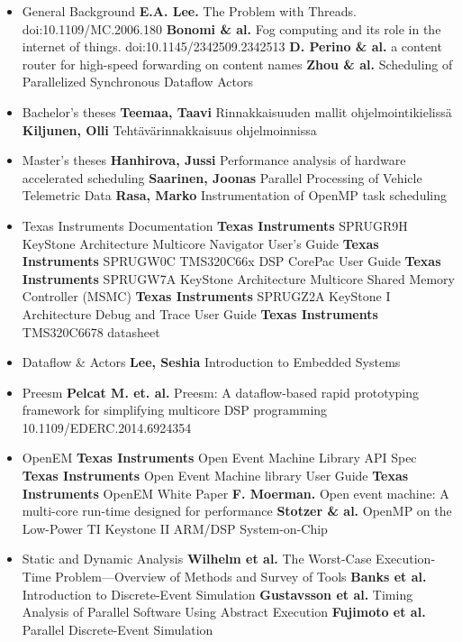 \begin{itemize}[leftmargin=-.5in]
\item[] General Background
    \subitem \textbf{E.A. Lee.} The Problem with Threads. doi:10.1109/MC.2006.180
    \subitem \textbf{Bonomi \& al.} Fog computing and its role in the internet of things. doi:10.1145/2342509.2342513
    \subitem \textbf{D. Perino \& al.} a content router for high-speed forwarding on content names
    \subitem \textbf{Zhou \& al.} Scheduling of Parallelized Synchronous Dataflow Actors
\item[] Bachelor's theses
    \subitem \textbf{Teemaa, Taavi} Rinnakkaisuuden mallit ohjelmointikielissä
    \subitem \textbf{Kiljunen, Olli} Tehtävärinnakkaisuus ohjelmoinnissa
\item[] Master's theses
    \subitem \textbf{Hanhirova, Jussi} Performance analysis of hardware accelerated scheduling
    \subitem \textbf{Saarinen, Joonas} Parallel Processing of Vehicle Telemetric Data
    \subitem \textbf{Rasa, Marko} Instrumentation of OpenMP task scheduling
\item[] Texas Instruments Documentation
    \subitem \textbf{Texas Instruments} SPRUGR9H KeyStone Architecture Multicore Navigator User's Guide
    \subitem \textbf{Texas Instruments} SPRUGW0C TMS320C66x DSP CorePac User Guide
    \subitem \textbf{Texas Instruments} SPRUGW7A KeyStone Architecture Multicore Shared Memory Controller (MSMC)
    \subitem \textbf{Texas Instruments} SPRUGZ2A KeyStone I Architecture Debug and Trace User Guide
    \subitem \textbf{Texas Instruments} TMS320C6678 datasheet
\item[] Dataflow \& Actors
    \subitem \textbf{Lee, Seshia} Introduction to Embedded Systems
\item[] Preesm
    \subitem \textbf{Pelcat M. et. al.} Preesm: A dataflow-based rapid prototyping framework for simplifying multicore DSP programming 10.1109/EDERC.2014.6924354
\item[] OpenEM
    \subitem \textbf{Texas Instruments} Open Event Machine Library API Spec
    \subitem \textbf{Texas Instruments} Open Event Machine library User Guide
    \subitem \textbf{Texas Instruments} OpenEM White Paper
    \subitem \textbf{F. Moerman.} Open event machine: A multi-core run-time designed for performance
    \subitem \textbf{Stotzer \& al.} OpenMP on the Low-Power TI Keystone II ARM/DSP System-on-Chip
\item[] Static and Dynamic Analysis
    \subitem \textbf{Wilhelm et al.} The Worst-Case Execution-Time Problem—Overview of Methods and Survey of Tools
    \subitem \textbf{Banks et al.} Introduction to Discrete-Event Simulation
    \subitem \textbf{Gustavsson et al.} Timing Analysis of Parallel Software Using Abstract Execution
    \subitem \textbf{Fujimoto et al.} Parallel Discrete-Event Simulation
\end{itemize}
